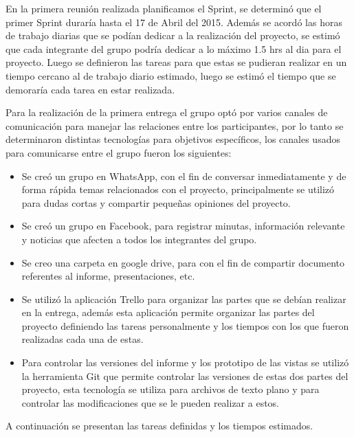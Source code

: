 \documentclass{memoria}
\begin{document}
\newpage


En la primera reunión realizada planificamos el Sprint, se determinó que el primer Sprint duraría hasta el 17 de Abril del 2015. Además se acordó las horas de trabajo diarias que se podían dedicar a la realización del proyecto, se estimó que cada integrante del grupo podría dedicar a lo máximo 1.5 hrs al dia para el proyecto. Luego se definieron las tareas para que estas se pudieran realizar en un tiempo cercano al de trabajo diario estimado, luego se estimó el tiempo que se demoraría cada tarea en estar realizada. 

Para la realización de la primera entrega el grupo optó por varios canales de comunicación para manejar las relaciones entre los participantes, por lo tanto se determinaron distintas tecnologías para objetivos específicos, los canales usados para comunicarse entre el grupo fueron los siguientes:

\begin{itemize}
	\item Se creó un grupo en WhatsApp, con el fin de conversar inmediatamente y de forma rápida temas relacionados con el proyecto, principalmente se utilizó para dudas cortas y compartir pequeñas opiniones del proyecto. 
	\item Se creó un grupo en Facebook, para registrar minutas, información relevante y noticias que afecten a todos los integrantes del grupo.
	\item Se creo una carpeta en google drive, para con el fin de compartir documento referentes al informe, presentaciones, etc.  
	\item Se utilizó la aplicación Trello para organizar las partes que se debían realizar en la entrega, además esta aplicación permite organizar las partes del proyecto definiendo las tareas personalmente y los tiempos con los que fueron realizadas cada una de estas.
	\item Para controlar las versiones del informe y los prototipo de las vistas se utilizó la herramienta Git que permite controlar las versiones de estas dos partes del proyecto, esta tecnología se utiliza para archivos de texto plano y para controlar las modificaciones que se le pueden realizar a estos.
\end{itemize}

\newpage

A continuación se presentan las tareas definidas y los tiempos estimados.
\end{document}
